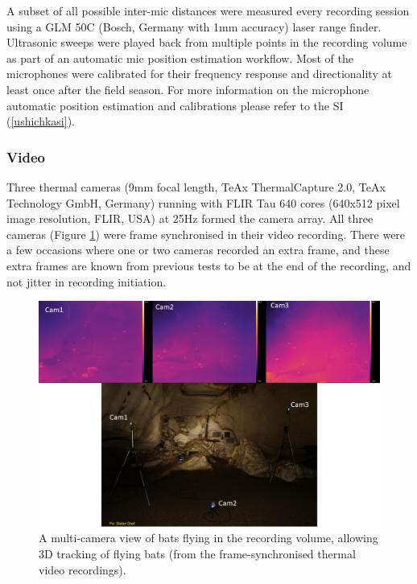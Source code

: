 \documentclass[
]{book}
\begin{document}
A subset of all possible inter-mic distances were measured every recording session using a GLM 50C (Bosch, Germany with 1mm accuracy) laser range finder. Ultrasonic sweeps were played back from multiple points in the recording volume as part of an automatic mic position estimation workflow. Most of the microphones were calibrated for their frequency response and directionality at least once after the field season. For more information on the microphone automatic position estimation and calibrations please refer to the SI (\ref{ushichkasi}).

\hypertarget{video}{%
\subsubsection{Video}\label{video}}

Three thermal cameras (9mm focal length, TeAx ThermalCapture 2.0, TeAx Technology GmbH, Germany) running with FLIR Tau 640 cores (640x512 pixel image resolution, FLIR, USA) at 25Hz formed the camera array. All three cameras (Figure \ref{fig:multicambats}) were frame synchronised in their video recording. There were a few occasions where one or two cameras recorded an extra frame, and these extra frames are known from previous tests to be at the end of the recording, and not jitter in recording initiation.

\begin{figure}
\includegraphics[width=1\linewidth]{original_papers/ushichka-figures/multicam_views} \caption{\label{fig:multicambats}A multi-camera view of bats flying in the recording volume, allowing 3D tracking of flying bats (from the frame-synchronised thermal video recordings).}\label{fig:multicambats}
\end{figure}
\end{document}
